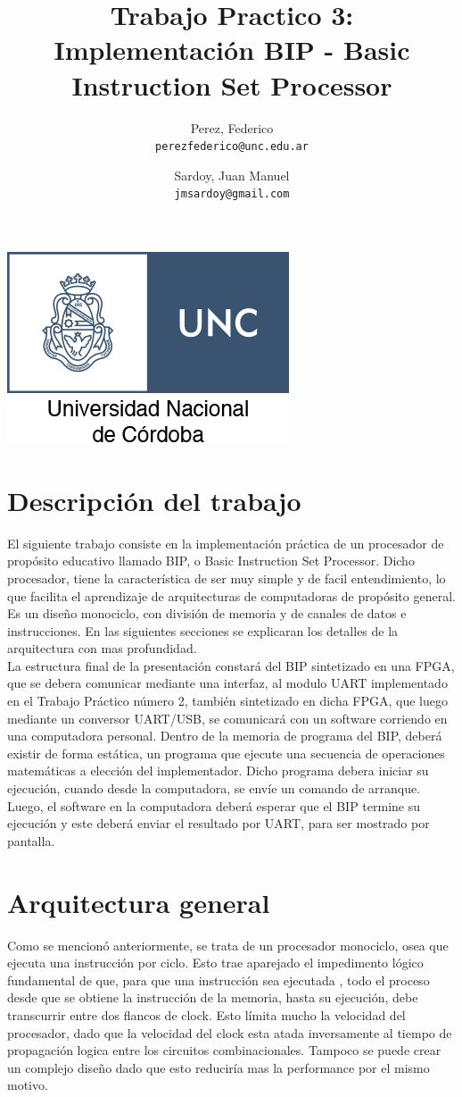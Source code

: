 \documentclass{article}
\title{Trabajo Practico 3: Implementación BIP - Basic Instruction Set Processor}
\author{Perez, Federico\\
        \texttt{perezfederico@unc.edu.ar}
        \and
        Sardoy, Juan Manuel\\
        \texttt{jmsardoy@gmail.com}
        }
\begin{document}
\maketitle
\begin{center}
    \includegraphics[scale=2]{unc-logo}
\end{center}
\newpage
\section{Descripción del trabajo}

\indent El siguiente trabajo consiste en la implementación práctica de un procesador de propósito educativo
llamado BIP, o Basic Instruction Set Processor. Dicho procesador, tiene la característica de ser muy simple
y de facil entendimiento, lo que facilita el aprendizaje de arquitecturas de computadoras de propósito general.
Es un diseño monociclo, con división de memoria y de canales de datos e instrucciones. En las siguientes secciones
se explicaran los detalles de la arquitectura con mas profundidad. \\
\indent La estructura final de la presentación constará del BIP sintetizado en una FPGA, que se debera comunicar
mediante una interfaz, al modulo UART implementado en el Trabajo Práctico número 2, también sintetizado en dicha FPGA,
que luego mediante un conversor UART/USB, se comunicará con un software corriendo en una computadora personal.
Dentro de la memoria de programa del BIP, deberá existir de forma estática, un programa que ejecute una secuencia de
operaciones matemáticas a elección del implementador. Dicho programa debera iniciar su ejecución, cuando desde la computadora,  se envíe un comando de arranque. Luego, el software en la computadora deberá esperar que el BIP
termine su ejecución y este deberá enviar el resultado por UART, para ser mostrado por pantalla.

\newpage
\section{Arquitectura general}
\indent Como se mencionó anteriormente, se trata de un procesador monociclo,
osea que ejecuta una instrucción por ciclo. Esto trae aparejado el impedimento lógico fundamental de que,
para que una instrucción sea ejecutada , todo el proceso desde que se obtiene la instrucción de la memoria,
hasta su ejecución, debe transcurrir entre dos flancos de clock. Esto límita mucho la velocidad del procesador,
dado que la velocidad del clock esta atada inversamente al tiempo de propagación logica entre los circuitos combinacionales.
Tampoco se puede crear un complejo diseño dado que esto reduciría mas la performance por el mismo motivo.
\end{document}
